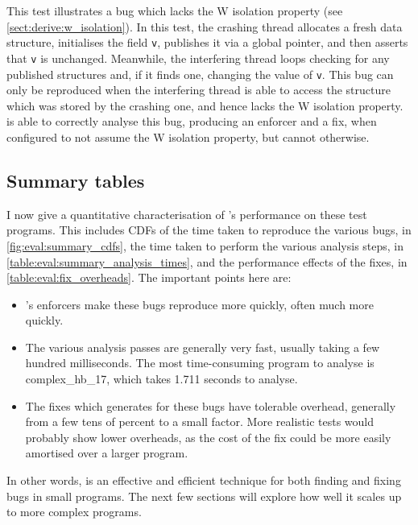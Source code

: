 This test illustrates a bug which lacks the W isolation property (see
\autoref{sect:derive:w_isolation}).  In this test, the crashing thread
allocates a fresh data structure, initialises the field \texttt{v},
publishes it via a global pointer, and then asserts that \texttt{v} is
unchanged.  Meanwhile, the interfering thread loops checking for any
published structures and, if it finds one, changing the value of
\texttt{v}.  This bug can only be reproduced when the interfering
thread is able to access the structure which was stored by the
crashing one, and hence lacks the W isolation property.
{\Implementation} is able to correctly analyse this bug, producing an
enforcer and a fix, when configured to not assume the W isolation
property, but cannot otherwise.

\subsection{Summary tables}

I now give a quantitative characterisation of {\technique}'s
performance on these test programs.  This includes CDFs of the time
taken to reproduce the various bugs, in
\autoref{fig:eval:summary_cdfs}, the time taken to perform the various
analysis steps, in \autoref{table:eval:summary_analysis_times}, and
the performance effects of the fixes, in
\autoref{table:eval:fix_overheads}.  The important points here are:

\begin{itemize}
\item {\Technique}'s enforcers make these bugs reproduce more quickly,
  often much more quickly.
\item The various analysis passes are generally very fast, usually
  taking a few hundred milliseconds.  The most time-consuming program
  to analyse is complex\_hb\_17, which takes 1.711 seconds to analyse.
\item The fixes which {\technique} generates for these bugs have
  tolerable overhead, generally from a few tens of percent to a small
  factor.  More realistic tests would probably show lower overheads,
  as the cost of the fix could be more easily amortised over a larger
  program.
\end{itemize}

In other words, {\technique} is an effective and efficient technique
for both finding and fixing bugs in small programs.  The next few
sections will explore how well it scales up to more complex programs.

